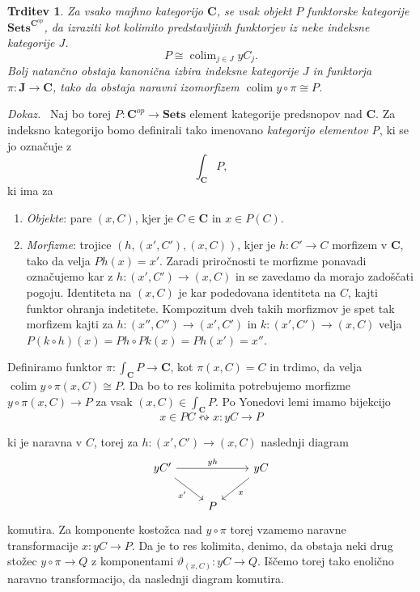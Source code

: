 \documentclass[12pt,a4paper]{book}
\theoremstyle{definition}
\theoremstyle{plain}
\newtheorem{trditev}[definicija]{Trditev}
\newenvironment{dokaz}{\emph{Dokaz.}\ }{\hspace{\fill}{$\Box$}}
\theoremstyle{definition}
\theoremstyle{remark}
\newcommand{\cat}[1]{\textbf{#1}}
\DeclareMathOperator{\colim}{colim}
\newcommand{\predsnop}[1]{\cat{Sets}^{\cat{#1}^{op}}}
\begin{document}
\begin{trditev}
\label{density theorem}
Za vsako majhno kategorijo $\cat{C}$, se vsak objekt $P$ funktorske kategorije $\predsnop{C}$, da izraziti kot kolimito predstavljivih funktorjev iz neke indeksne kategorije $J$.
$$ P \cong \colim_{j \in J} yC_j.$$
Bolj natančno obstaja kanonična izbira indeksne kategorije $J$ in funktorja $\pi : \cat{J} \to \cat{C}$, tako da obstaja naravni izomorfizem $\colim y \circ \pi \cong P$.
\end{trditev}
\begin{dokaz}
Naj bo torej $P : \cat{C}^{op} \to \cat{Sets}$ element kategorije predsnopov nad $\cat{C}$. Za indeksno kategorijo bomo definirali tako imenovano \emph{kategorijo elementov P}, ki se jo označuje z
$$\int_{\cat{C}}P,$$
ki ima za
\begin{enumerate}
\item \emph{Objekte}: pare $(x,C)$, kjer je $C \in \cat{C}$ in $x \in P(C)$.
\item \emph{Morfizme}: trojice $(h, (x',C'), (x,C))$, kjer je $h : C' \to C$ morfizem v $\cat{C}$, tako da velja $Ph(x) = x'$. Zaradi priročnosti te morfizme ponavadi označujemo kar z $h : (x', C') \to (x,C)$ in se zavedamo da morajo zadoščati pogoju.
Identiteta na $(x,C)$ je kar podedovana identiteta na $C$, kajti funktor ohranja indetitete. Kompozitum dveh takih morfizmov je spet tak morfizem kajti za $h : (x'', C'') \to (x', C')$ in $k : (x', C') \to (x,C)$ velja $P(k \circ h)(x) = Ph \circ Pk(x) = Ph(x') = x''$.
\end{enumerate}

Definiramo funktor $\pi : \int_{\cat{C}}P \to \cat{C}$, kot $\pi(x,C) = C$ in trdimo, da velja $\colim y\circ \pi (x,C) \cong P$. Da bo to res kolimita potrebujemo morfizme $y\circ \pi (x,C) \to P$ za vsak $(x,C) \in \int_{\cat{C}}P$. Po Yonedovi lemi imamo bijekcijo
$$x \in PC \leftrightsquigarrow x:yC \to P$$

ki je naravna v $C$, torej za $h: (x',C') \to (x,C)$ naslednji diagram
$$ \begin{tikzcd}
yC' \ar[rr, "yh"] \ar[rd, "x'"'] & & yC \ar[ld, "x"] \\
& P &
\end{tikzcd} $$
komutira. Za komponente kostožca nad $y \circ \pi$ torej vzamemo naravne transformacije $x : yC \to P$. Da je to res kolimita, denimo, da obstaja neki drug stožec $y \circ \pi \to Q$ z komponentami $\vartheta_{(x,C)} : yC \to Q$. Iščemo torej tako enolično naravno transformacijo, da naslednji diagram komutira.


\end{dokaz}
\end{document}
